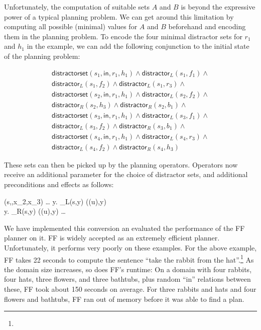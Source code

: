 Unfortunately, the computation of suitable sets $A$ and $B$ is beyond
the expressive power of a typical planning problem.  We can get around
this limitation by computing all possible (minimal) values for $A$ and
$B$ beforehand and encoding them in the planning problem.  To encode
the four minimal distractor sets for $r_1$ and $h_1$ in the example,
we can add the following conjunction to the initial state of the
planning problem:

$$
\begin{array}{l}
  \mathsf{distractorset}(s_1,\mathsf{in},r_1,h_1) \wedge
  \mathsf{distractor}_L(s_1,f_1) \wedge \\ \mathsf{distractor}_L(s_1,f_2)
  \wedge \mathsf{distractor}_L(s_1,r_3)  \wedge \\
%
  \mathsf{distractorset}(s_2,\mathsf{in},r_1,h_1) \wedge
  \mathsf{distractor}_L(s_2,f_2) \wedge \\ \mathsf{distractor}_R(s_2,h_3)
  \wedge \mathsf{distractor}_R(s_2,b_1) \wedge \\
%
  \mathsf{distractorset}(s_3,\mathsf{in},r_1,h_1) \wedge
  \mathsf{distractor}_L(s_3,f_1) \wedge \\ \mathsf{distractor}_L(s_3,f_2)
  \wedge \mathsf{distractor}_R(s_3,b_1) \wedge \\
%
  \mathsf{distractorset}(s_4,\mathsf{in},r_1,h_1) \wedge
  \mathsf{distractor}_L(s_4,r_3) \wedge \\ \mathsf{distractor}_L(s_4,f_2)
  \wedge \mathsf{distractor}_R(s_4,h_3) 
\end{array}
$$

These sets can then be picked up by the planning operators.  Operators
now receive an additional parameter for the choice of distractor sets,
and additional preconditions and effects as follows:

{(s,,x_2,x_3) \wedge \ldots}
{\forall y. _L(s,y) \rightarrow
  ((u),y)
\wedge \\
\forall y. _R(s,y) \rightarrow
  ((u),y)
\wedge \ldots
}

We have implemented this conversion an evaluated the performance of
the FF planner \cite{HoffmannNebel01} on it.  FF is widely accepted as
an extremely efficient planner.  Unfortunately, it performs very
poorly on these examples.  For the above example, FF takes 22 seconds
to compute the sentence ``take the rabbit from the
hat''.\footnote{}  As the domain size increases, so does FF's
runtime: On a domain with four rabbits, four hats, three flowers, and
three bathtubs, plus random ``in'' relations between these, FF took
about 150 seconds on average.  For three rabbits and hats and four
flowers and bathtubs, FF ran out of memory before it was able to find
a plan.



